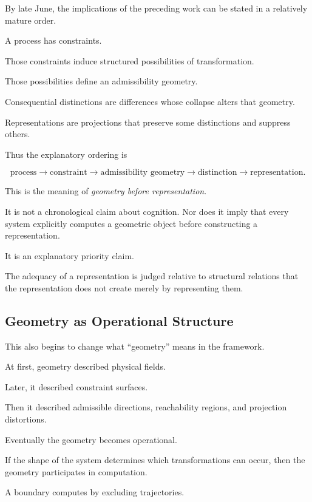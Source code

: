 \documentclass[11pt]{article}
\theoremstyle{remark}
\begin{document}
By late June, the implications of the preceding work can be stated in a relatively mature order.

A process has constraints.

Those constraints induce structured possibilities of transformation.

Those possibilities define an admissibility geometry.

Consequential distinctions are differences whose collapse alters that geometry.

Representations are projections that preserve some distinctions and suppress others.

Thus the explanatory ordering is

\begin{equation}
\boxed{
\text{process}
\rightarrow
\text{constraint}
\rightarrow
\text{admissibility geometry}
\rightarrow
\text{distinction}
\rightarrow
\text{representation}.
}
\end{equation}

This is the meaning of \emph{geometry before representation}.

It is not a chronological claim about cognition. Nor does it imply that every system explicitly computes a geometric object before constructing a representation.

It is an explanatory priority claim.

The adequacy of a representation is judged relative to structural relations that the representation does not create merely by representing them.

\subsection{Geometry as Operational Structure}

This also begins to change what ``geometry'' means in the framework.

At first, geometry described physical fields.

Later, it described constraint surfaces.

Then it described admissible directions, reachability regions, and projection distortions.

Eventually the geometry becomes operational.

If the shape of the system determines which transformations can occur, then the geometry participates in computation.

A boundary computes by excluding trajectories.
\end{document}
